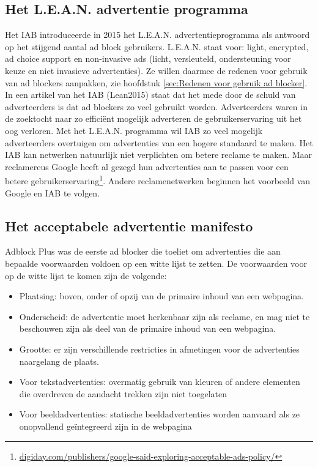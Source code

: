 \documentclass[pdftex,a4paper,12pt,twoside]{report}
\begin{document}
\subsection{Het L.E.A.N. advertentie programma}
\label{sec Het L.E.A.N. advertentie programma}
 Het IAB introduceerde in 2015 het L.E.A.N. advertentieprogramma als antwoord op het stijgend aantal ad block gebruikers. L.E.A.N. staat voor: light, encrypted, ad choice support en non-invasive ads (licht, versleuteld, ondersteuning voor keuze en niet invasieve advertenties). Ze willen daarmee de redenen voor gebruik van ad blockers aanpakken, zie hoofdstuk \ref{sec:Redenen voor gebruik ad blocker}. In een artikel van het IAB (Lean2015) staat dat het mede door de schuld van adverteerders is dat ad blockers zo veel gebruikt worden. Adverteerders waren in de zoektocht naar zo efficiënt mogelijk adverteren de gebruikerservaring uit het oog verloren. Met het L.E.A.N. programma wil IAB zo veel mogelijk adverteerders overtuigen om advertenties van een hogere standaard te maken. Het IAB kan netwerken natuurlijk niet verplichten om betere reclame te maken. Maar reclamereus Google heeft al gezegd hun advertenties aan te passen voor een betere gebruikerservaring\footnote{\url{digiday.com/publishers/google-said-exploring-acceptable-ads-policy/}}. Andere reclamenetwerken beginnen het voorbeeld van Google en IAB te volgen.

\subsection{Het acceptabele advertentie manifesto}
\label{sec Het acceptabele advertentie manifesto}
Adblock Plus was de eerste ad blocker die toeliet om advertenties die aan bepaalde voorwaarden voldoen op een witte lijst te zetten. De voorwaarden voor op de witte lijst te komen zijn de volgende:

\begin{itemize}
	\item Plaatsing: boven, onder of opzij van de primaire inhoud van een webpagina.
	\item Onderscheid: de advertentie moet herkenbaar zijn als reclame, en mag niet te beschouwen zijn als deel van de primaire inhoud van een webpagina.
	\item Grootte: er zijn verschillende restricties in afmetingen voor de advertenties naargelang de plaats.
	\item Voor tekstadvertenties: overmatig gebruik van kleuren of andere elementen die overdreven de aandacht trekken zijn niet toegelaten
	\item Voor beeldadvertenties: statische beeldadvertenties worden aanvaard als ze onopvallend geïntegreerd zijn in de webpagina
\end{itemize}
\end{document}
